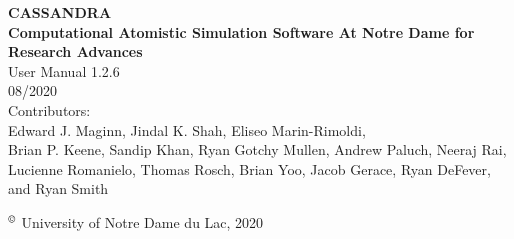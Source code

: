 \begin{center}
\vspace*{2 in}
{\huge{\bf CASSANDRA} }\\
\vspace{0.5in}
{\huge { \bf  Computational Atomistic Simulation Software At Notre Dame for Research Advances}} \\
\vspace{1 in}
User Manual 1.2.6 \\
\vspace{.2 in}
08/2020 \\
\vspace{0.2in}
Contributors: \\
\vspace{0.2in}
Edward J. Maginn, Jindal K. Shah, Eliseo Marin-Rimoldi, \\
Brian P. Keene, Sandip Khan, Ryan Gotchy Mullen, Andrew Paluch,
Neeraj Rai, Lucienne Romanielo, Thomas Rosch, Brian Yoo, Jacob Gerace, Ryan DeFever, and Ryan Smith
\end{center}
\vspace{1.0in}
$^\copyright$ University of Notre Dame du Lac, 2020
